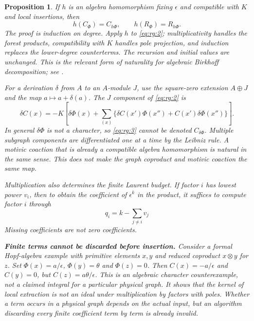 \documentclass[11pt,a4paper,oneside]{article}
\theoremstyle{plain}
\newtheorem{proposition}[theorem]{Proposition}
\theoremstyle{definition}
\theoremstyle{remark}
\numberwithin{equation}{section}
\begin{document}
\begin{proposition}\label{thm:rg:2.1}
If $h$ is an algebra homomorphism fixing $\epsilon$ and compatible with $K$ and local insertions, then
\begin{equation}
h(C_\Phi)=C_{h\Phi},\qquad h(R_\Phi)=R_{h\Phi}.
\end{equation}
The proof is induction on degree. Apply $h$ to \eqref{eq:rg:2}; multiplicativity handles the forest products, compatibility with $K$ handles pole projection, and induction replaces the lower-degree counterterms. The recursion and initial values are unchanged. This is the relevant form of naturality for algebraic Birkhoff decomposition; see \cite[Theorem 3.2]{guozhang}.

For a derivation $\delta$ from $A$ to an $A$-module $J$, use the square-zero extension $A\oplus J$ and the map $a\mapsto a+\delta(a)$. The $J$ component of \eqref{eq:rg:2} is
\begin{equation}
\delta C(x)=-K\left[\delta\Phi(x)+
 \sum_{(x)}\{\delta C(x')\Phi(x'')+
                 C(x')\delta\Phi(x'')\}\right].    \label{eq:rg:3}
\end{equation}
In general $\delta\Phi$ is not a character, so \eqref{eq:rg:3} cannot be denoted $C_{\delta\Phi}$. Multiple subgraph components are differentiated one at a time by the Leibniz rule. A motivic coaction that is already a compatible algebra homomorphism is natural in the same sense. This does not make the graph coproduct and motivic coaction the same map.

Multiplication also determines the finite Laurent budget. If factor $i$ has lowest power $v_i$, then to obtain the coefficient of $\epsilon^k$ in the product, it suffices to compute factor $i$ through
\begin{equation}
q_i=k-\sum_{j\ne i}v_j                            \label{eq:rg:4}
\end{equation}
Missing coefficients are not zero coefficients.

\textbf{Finite terms cannot be discarded before insertion.}
Consider a formal Hopf-algebra example with primitive elements $x,y$ and reduced coproduct $x\otimes y$ for $z$. Set $\Phi(x)=a/\epsilon$, $\Phi(y)=\theta$ and $\Phi(z)=0$. Then $C(x)=-a/\epsilon$ and $C(y)=0$, but $C(z)=a\theta/\epsilon$. This is an algebraic character counterexample, not a claimed integral for a particular physical graph. It shows that the kernel of local extraction is not an ideal under multiplication by factors with poles. Whether a term occurs in a physical graph depends on the actual input, but an algorithm discarding every finite coefficient term by term is already invalid.
\end{proposition}
\end{document}
